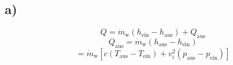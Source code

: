 

\subsection*{a)}
\[
Q = \dot{m}_{\text{w}} (h_{\text{ein}} - h_{\text{aus}}) + Q_{\text{aus}}
\]
\[
Q_{\text{aus}} = \dot{m}_{\text{w}} (h_{\text{aus}} - h_{\text{ein}})
\]
\[
= \dot{m}_{\text{w}} \left[ c (T_{\text{aus}} - T_{\text{ein}}) + v_i^2 (p_{\text{aus}} - p_{\text{ein}}) \right]
\]